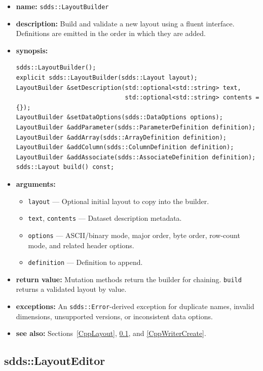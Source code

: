\documentclass[11pt]{article}
\begin{document}
\begin{itemize}
\item {\bf name:}\newline
{\tt sdds::LayoutBuilder}
\item {\bf description:}\newline
Build and validate a new layout using a fluent interface.  Definitions are
emitted in the order in which they are added.
\item {\bf synopsis:}
\begin{verbatim}
sdds::LayoutBuilder();
explicit sdds::LayoutBuilder(sdds::Layout layout);
LayoutBuilder &setDescription(std::optional<std::string> text,
                              std::optional<std::string> contents = {});
LayoutBuilder &setDataOptions(sdds::DataOptions options);
LayoutBuilder &addParameter(sdds::ParameterDefinition definition);
LayoutBuilder &addArray(sdds::ArrayDefinition definition);
LayoutBuilder &addColumn(sdds::ColumnDefinition definition);
LayoutBuilder &addAssociate(sdds::AssociateDefinition definition);
sdds::Layout build() const;
\end{verbatim}
\item {\bf arguments:}
\begin{itemize}
\item {\tt layout} --- Optional initial layout to copy into the builder.
\item {\tt text}, {\tt contents} --- Dataset description metadata.
\item {\tt options} --- ASCII/binary mode, major order, byte order, row-count
mode, and related header options.
\item {\tt definition} --- Definition to append.
\end{itemize}
\item {\bf return value:}\newline
Mutation methods return the builder for chaining.  {\tt build} returns a
validated layout by value.
\item {\bf exceptions:}\newline
An {\tt sdds::Error}-derived exception for duplicate names, invalid dimensions,
unsupported versions, or inconsistent data options.
\item {\bf see also:}\newline
Sections~\ref{CppLayout}, \ref{CppLayoutEditor}, and \ref{CppWriterCreate}.
\end{itemize}

\subsection{sdds::LayoutEditor}
\label{CppLayoutEditor}
\end{document}

